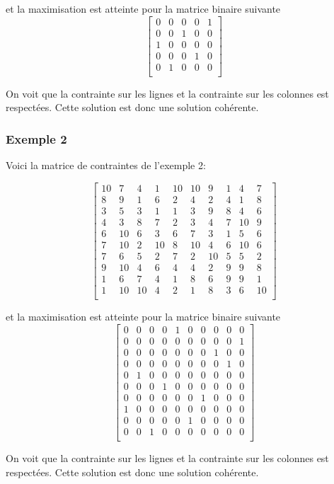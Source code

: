 et la maximisation est atteinte pour la matrice binaire suivante
\[
\begin{bmatrix}
    0 & 0 & 0 & 0 & 1 \\
    0 & 0 & 1 & 0 & 0 \\
    1 & 0 & 0 & 0 & 0 \\
    0 & 0 & 0 & 1 & 0 \\
    0 & 1 & 0 & 0 & 0 \\
\end{bmatrix}
\]

On voit que la contrainte sur les lignes et la contrainte sur les colonnes est respectées.
Cette solution est donc une solution cohérente.


\subsubsection{Exemple 2}
Voici la matrice de contraintes de l'exemple 2:

\[
\begin{bmatrix}
    10 & 7 & 4 & 1 & 10 & 10 & 9 & 1 & 4 & 7 \\
    8 & 9 & 1 & 6 & 2 & 4 & 2 & 4 & 1 & 8 \\
    3 & 5 & 3 & 1 & 1 & 3 & 9 & 8 & 4 & 6 \\
    4 & 3 & 8 & 7 & 2 & 3 & 4 & 7 & 10 & 9 \\
    6 & 10 & 6 & 3 & 6 & 7 & 3 & 1 & 5 & 6 \\
    7 & 10 & 2 & 10 & 8 & 10 & 4 & 6 & 10 & 6 \\
    7 & 6 & 5 & 2 & 7 & 2 & 10 & 5 & 5 & 2 \\
    9 & 10 & 4 & 6 & 4 & 4 & 2 & 9 & 9 & 8 \\
    1 & 6 & 7 & 4 & 1 & 8 & 6 & 9 & 9 & 1 \\
    1 & 10 & 10 & 4 & 2 & 1 & 8 & 3 & 6 & 10 \\
\end{bmatrix}
\]



et la maximisation est atteinte pour la matrice binaire suivante
\[
\begin{bmatrix}
    0 & 0 & 0 & 0 & 1 & 0 & 0 & 0 & 0 & 0 \\
    0 & 0 & 0 & 0 & 0 & 0 & 0 & 0 & 0 & 1 \\
    0 & 0 & 0 & 0 & 0 & 0 & 0 & 1 & 0 & 0 \\
    0 & 0 & 0 & 0 & 0 & 0 & 0 & 0 & 1 & 0 \\
    0 & 1 & 0 & 0 & 0 & 0 & 0 & 0 & 0 & 0 \\
    0 & 0 & 0 & 1 & 0 & 0 & 0 & 0 & 0 & 0 \\
    0 & 0 & 0 & 0 & 0 & 0 & 1 & 0 & 0 & 0 \\
    1 & 0 & 0 & 0 & 0 & 0 & 0 & 0 & 0 & 0 \\
    0 & 0 & 0 & 0 & 0 & 1 & 0 & 0 & 0 & 0 \\
    0 & 0 & 1 & 0 & 0 & 0 & 0 & 0 & 0 & 0 \\
\end{bmatrix}
\]

On voit que la contrainte sur les lignes et la contrainte sur les colonnes est respectées.
Cette solution est donc une solution cohérente.


